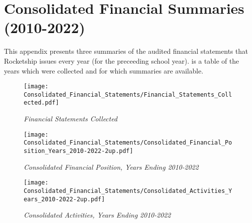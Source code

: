 
\chapter{Consolidated Financial Summaries (2010-2022)}\label{ch:consolidated_financial_summaries}\indent

This appendix presents three summaries of the audited financial statements that Rocketship issues every year (for the preceeding school year).  is a table of the years which were collected and for which summaries are available.

\begin{figure}[hb]
  \caption[Financial Statements Collected]{\textit{Financial Statements Collected}}
  \label{fig:financial-statements-collected} %
  \vspace{-0.4in}
  \texttt{[image: Consolidated\_Financial\_Statements/Financial\_Statements\_Collected.pdf]}\\
\end{figure}

\begin{sidewaysfigure}
  \caption[Consolidated Financial Position, Years Ending 2010–2022]{\textit{Consolidated Financial Position, Years Ending 2010-2022}}
 \label{fig:consolidated_financial_position_2010-2022} %
\texttt{[image: Consolidated\_Financial\_Statements/Consolidated\_Financial\_Position\_Years\_2010-2022-2up.pdf]}\\ %
\end{sidewaysfigure}

\begin{sidewaysfigure}
  \caption[Consolidated Activities, Years Ending 2010–2022]{\textit{Consolidated Activities, Years Ending 2010-2022}}\label{fig:consolidated_activities_2010-2022} %
  \texttt{[image: Consolidated\_Financial\_Statements/Consolidated\_Activities\_Years\_2010-2022-2up.pdf]}\\ %
  \end{sidewaysfigure}


